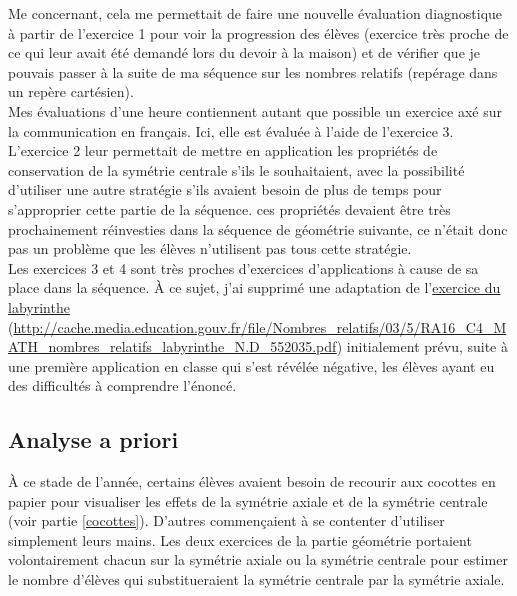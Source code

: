 Me concernant, cela me permettait de faire une nouvelle évaluation diagnostique à partir de l'exercice 1 pour voir la progression des élèves (exercice très proche de ce qui leur avait été demandé lors du devoir à la maison) et de vérifier que je pouvais passer à la suite de ma séquence sur les nombres relatifs (repérage dans un repère cartésien).\\

Mes évaluations d'une heure contiennent autant que possible un exercice axé sur la communication en français. Ici, elle est évaluée à l'aide de l'exercice 3.\\

L'exercice 2 leur permettait de mettre en application les propriétés de conservation de la symétrie centrale s'ils le souhaitaient, avec la possibilité d'utiliser une autre stratégie s'ils avaient besoin de plus de temps pour s'approprier cette partie de la séquence. ces propriétés devaient être très prochainement réinvesties dans la séquence de géométrie suivante, ce n'était donc pas un problème que les élèves n'utilisent pas tous cette stratégie.\\

Les exercices 3 et 4 sont très proches d'exercices d'applications à cause de sa place dans la séquence. À ce sujet, j'ai supprimé une adaptation de l'\href{http://cache.media.education.gouv.fr/file/Nombres_relatifs/03/5/RA16_C4_MATH_nombres_relatifs_labyrinthe_N.D_552035.pdf}{exercice du labyrinthe} 
(\url{http://cache.media.education.gouv.fr/file/Nombres_relatifs/03/5/RA16_C4_MATH_nombres_relatifs_labyrinthe_N.D_552035.pdf}) initialement prévu, suite à une première application en classe qui s'est révélée négative, les élèves ayant eu des difficultés à comprendre l'énoncé.

\subsection{Analyse a priori}
À ce stade de l'année, certains élèves avaient besoin de recourir aux cocottes en papier pour visualiser les effets de la symétrie axiale et de la symétrie centrale (voir partie \ref{cocottes}). D'autres commençaient à se contenter d'utiliser simplement leurs mains. Les deux exercices de la partie géométrie portaient volontairement chacun sur la symétrie axiale ou la symétrie centrale pour estimer le nombre d'élèves qui substitueraient la symétrie centrale par la symétrie axiale.\\

